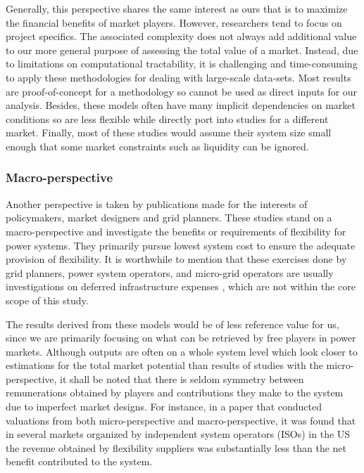 Generally, this perspective shares the same interest as ours that is to maximize the financial benefits of market players. However, researchers tend to focus on project specifics. The associated complexity does not always add additional value to our more general purpose of assessing the total value of a market. Instead, due to limitations on computational tractability, it is challenging and time-consuming to apply these methodologies for dealing with large-scale data-sets. Most results are proof-of-concept for a methodology so cannot be used as direct inputs for our analysis. Besides, these models often have many implicit dependencies on market conditions so are less flexible while directly port into studies for a different market. Finally, most of these studies would assume their system size small enough that some market constraints such as liquidity can be ignored.


\subsubsection{Macro-perspective}

Another perspective is taken by publications made for the interests of policymakers, market designers and grid planners. These studies stand on a macro-perspective and investigate the benefits or requirements of flexibility for power systems. They primarily pursue lowest system cost to ensure the adequate provision of flexibility. It is worthwhile to mention that these exercises done by grid planners, power system operators, and micro-grid operators are usually investigations on deferred infrastructure expenses \cite{Siano2014,HDREngineeringInc.2014,Gunter2016}, which are not within the core scope of this study.

The results derived from these models would be of less reference value for us, since we are primarily focusing on what can be retrieved by free players in power markets. Although outputs are often on a whole system level which look closer to estimations for the total market potential than results of studies with the micro-perspective, it shall be noted that there is seldom symmetry between remunerations obtained by players and contributions they make to the system due to imperfect market designs. For instance, in a paper that conducted valuations from both micro-perspective and macro-perspective, it was found that in several markets organized by independent system operators (ISOs) in the US the revenue obtained by flexibility suppliers was substantially less than the net benefit contributed to the system\cite{Denholm2013}.

